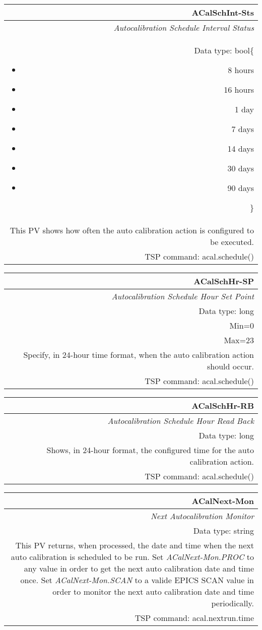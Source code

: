 \documentclass[openany]{article}
\begin{document}
		\begin{tabular}{N}
			\hline
			\bfseries ACalSchInt-Sts\label{pv:acalschint-sts} \\ \hline
			\emph{Autocalibration Schedule Interval Status} \\
			Data type: bool\{\begin{itemize}[noitemsep]
				\small
				\item[] 8 hours
				\item[] 16 hours
				\item[] 1 day
				\item[] 7 days
				\item[] 14 days
				\item[] 30 days
				\item[] 90 days
			\end{itemize}\} \\
			This PV shows how often the auto calibration action is configured to be executed. \\
			TSP command: acal.schedule()
		\end{tabular}

		\begin{tabular}{N}
			\hline
			\bfseries ACalSchHr-SP\label{pv:acalschhr-sp} \\ \hline
			\emph{Autocalibration Schedule Hour Set Point} \\
			Data type: long \\
			Min=0 \\
			Max=23 \\
			Specify, in 24-hour time format, when the auto calibration action should occur. \\
			TSP command: acal.schedule()
		\end{tabular}

		\begin{tabular}{N}
			\hline
			\bfseries ACalSchHr-RB\label{pv:acalschhr-rb} \\ \hline
			\emph{Autocalibration Schedule Hour Read Back} \\
			Data type: long \\
			Shows, in 24-hour format, the configured time for the auto calibration action. \\
			TSP command: acal.schedule()
		\end{tabular}

		\begin{tabular}{N}
			\hline
			\bfseries ACalNext-Mon\label{pv:acalnext-mon} \\ \hline
			\emph{Next Autocalibration Monitor} \\
			Data type: string \\
			This PV returns, when processed, the date and time when the next auto calibration is scheduled to be run. Set \emph{ACalNext-Mon.PROC} to any value in order to get the next auto calibration date and time once. Set \emph{ACalNext-Mon.SCAN} to a valide EPICS SCAN value in order to monitor the next auto calibration date and time periodically. \\
			TSP command: acal.nextrun.time
		\end{tabular}
\end{document}
